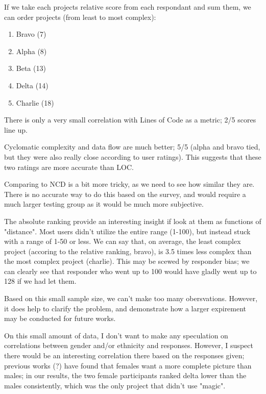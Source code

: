 \documentclass[]{article}
\begin{document}
If we take each projects relative score from each respondant and sum them, we can order projects (from least to most complex):
\begin{enumerate}
	\item Bravo (7)
	\item Alpha (8)
	\item Beta (13)
	\item Delta (14)
	\item Charlie (18)
\end{enumerate}

There is only a very small correlation with Lines of Code as a metric; 2/5 scores line up.

Cyclomatic complexity and data flow are much better; 5/5 (alpha and bravo tied, but they were also really close according to user ratings).
This suggests that these two ratings are more accurate than LOC.

Comparing to NCD is a bit more tricky, as we need to see how similar they are.
There is no accurate way to do this based on the survey, and would require a much larger testing group as it would be much more subjective.

The absolute ranking provide an interesting insight if look at them as functions of "distance".
Most users didn't utilize the entire range (1-100), but instead stuck with a range of 1-50 or less.
We can say that, on average, the least complex project (accoring to the relative ranking, bravo), is 3.5 times less complex than the most complex project (charlie).
This may be scewed by responder bias; we can clearly see that responder who went up to 100 would have gladly went up to 128 if we had let them.

Based on this small sample size, we can't make too many obersvations.
However, it does help to clarify the problem, and demonstrate how a larger expirement may be conducted for future works.

On this small amount of data, I don't want to make any speculation on correlations between gender and/or ethnicity and responses.
However, I suspect there would be an interesting correlation there based on the responses given; previous works (?) have found that females want a more complete picture than males; in our results, the two female participants ranked delta lower than the males consistently, which was the only project that didn't use "magic".
\end{document}
